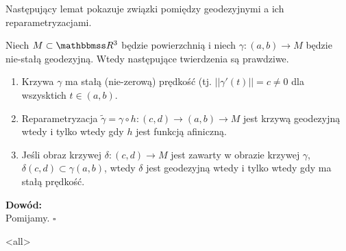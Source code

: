 Następujący lemat pokazuje związki pomiędzy geodezyjnymi a ich reparametryzacjami.
\begin{frame}
\begin{lemat}\label{lem:param-of-geodesics}
Niech $M\subset \R^3$ będzie powierzchnią i niech $\gamma\colon(a,b)\to M$ będzie nie-stałą geodezyjną. Wtedy następujące twierdzenia są prawdziwe.
\begin{enumerate}
\item Krzywa $\gamma$ ma stałą (nie-zerową) prędkość (tj. $||\gamma'(t)||=c\neq 0$ dla wszysktich $t\in(a,b)$.
\pause\item Reparametryzacja $\widetilde{\gamma}=\gamma\circ h\colon (c,d)\to (a,b)\to M$ jest krzywą geodezyjną wtedy i tylko wtedy gdy $h$ jest funkcją afiniczną.
\pause\item Jeśli obraz krzywej $\delta\colon (c,d)\to M$ jest zawarty w obrazie krzywej $\gamma$, $\delta(c,d)\subset \gamma(a,b)$, wtedy $\delta$ jest geodezyjną wtedy i tylko wtedy gdy ma stałą prędkość.
\end{enumerate}
\end{lemat}

\pause \textcolor{ared}{\textbf{Dowód: }}\\
Pomijamy.
\hfill $\square$

\end{frame}

\mode<all> 
